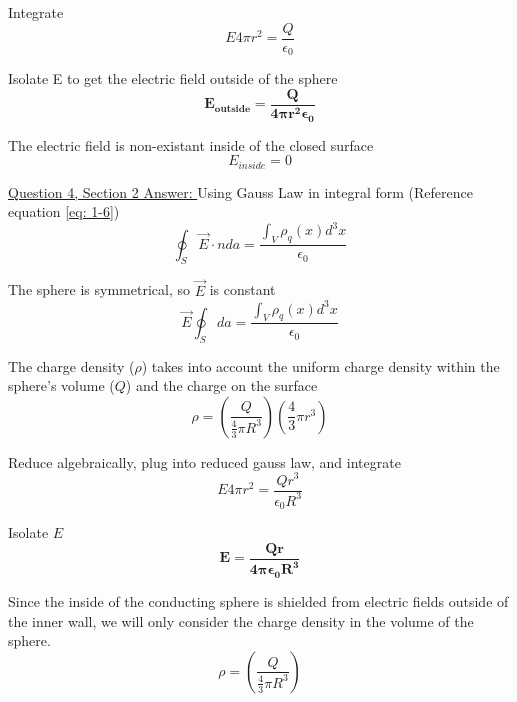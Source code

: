 \documentclass[English]{article}
\begin{document}
    Integrate
    \begin{equation} \label{eq: 4-3}
        E 4 \pi r^2 = \frac{Q}{\epsilon_0}
    \end{equation}

    Isolate E to get the electric field outside of the sphere
    \begin{equation} \label{eq: 4-4}
        \boxed{\boldsymbol{E_{outside} = \frac{Q}{4 \pi r^2 \epsilon_0}}}
    \end{equation}

    The electric field is non-existant inside of the closed surface
    \begin{equation} \label{eq: 4-5}
        E_{inside} = 0
    \end{equation}

    \underline{Question 4, Section 2 Answer: }
    \newline \newline Using Gauss Law in integral form (Reference equation \ref{eq: 1-6})
    \begin{equation}
        \oint_S \vec{E} \cdot n da = \frac{\int_V \rho_q(x) d^3 x}{\epsilon_0}        
    \end{equation}

    The sphere is symmetrical, so $\vec{E}$ is constant
    \begin{equation} \label{eq: 4-7}
        \vec{E} \oint_S da = \frac{\int_V \rho_q(x) d^3 x}{\epsilon_0}         
    \end{equation}

    The charge density ($\rho$) takes into account the uniform charge density within the sphere's volume ($Q$) and the charge on the surface
    \begin{equation} \label{eq: 4-8}
        \rho = (\frac{Q}{\frac{4}{3} \pi R^3}) (\frac{4}{3} \pi r^3)
    \end{equation}

    Reduce algebraically, plug into reduced gauss law, and integrate
    \begin{equation} \label{eq: 4-9}
        E 4 \pi r^2 = \frac{Q r^3}{\epsilon_0 R^3}
    \end{equation}

    Isolate $E$
    \begin{equation} \label{eq: 4-10}
        \boxed{\boldsymbol{E = \frac{Q r}{4 \pi \epsilon_0 R^3}}}
    \end{equation}

    Since the inside of the conducting sphere is shielded from electric fields outside of the inner wall, we will only consider the charge density in the volume of the sphere. 
    \begin{equation} \label{eq: 4-11}
        \rho = (\frac{Q}{\frac{4}{3} \pi R^3})
    \end{equation}
\end{document}
